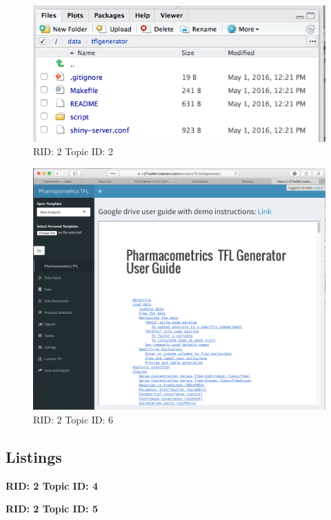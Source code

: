 \documentclass{article}
\begin{document}
\begin{figure}[!htbp]
\includegraphics[width=.8\textwidth]{screencaps/2-2-1.png}
\caption{RID: 2 Topic ID: 2}
\end{figure}

\begin{figure}[!htbp]
\includegraphics[width=.8\textwidth]{screencaps/2-6-1.png}
\caption{RID: 2 Topic ID: 6}
\end{figure}



\newpage

\subsection*{Listings}

{\bf RID: 2 Topic ID: 4}



\newpage
{\bf RID: 2 Topic ID: 5}


 
\end{document}
